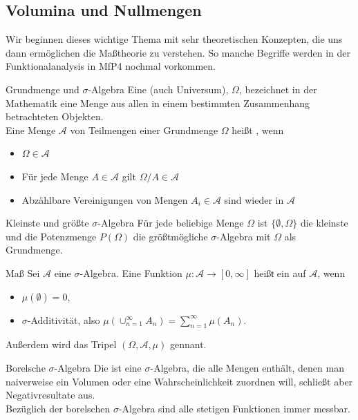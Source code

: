 \subsection{Volumina und Nullmengen}

Wir beginnen dieses wichtige Thema mit sehr theoretischen Konzepten, die uns dann ermöglichen die Maßtheorie zu verstehen. So manche Begriffe werden in der Funktionalanalysis in MfP4 nochmal vorkommen.
\begin{Def}{Grundmenge und $\sigma$-Algebra}
Eine  (auch Universum), $\Omega$, bezeichnet in der Mathematik eine Menge aus allen in einem bestimmten Zusammenhang betrachteten Objekten. \\
Eine Menge $\mathcal{A}$ von Teilmengen einer Grundmenge $\Omega$ heißt , wenn
\begin{itemize}
    \item $\Omega \in \mathcal{A}$
    \item Für jede Menge $A\in \mathcal{A}$ gilt $\Omega / A\in \mathcal{A}$
    \item Abzählbare Vereinigungen von Mengen $A_i\in \mathcal{A}$ sind wieder in $\mathcal{A}$
\end{itemize}
\end{Def}
\begin{Beispiel}{Kleinste und größte $\sigma$-Algebra}
Für jede beliebige Menge $\Omega$ ist $\{\emptyset, \Omega\}$ die kleinste und die Potenzmenge $P(\Omega)$ die größtmögliche $\sigma$-Algebra mit $\Omega$ als Grundmenge.
\end{Beispiel}
\begin{Def}{Maß}
Sei $\mathcal{A}$ eine $\sigma$-Algebra. Eine Funktion $\mu: \mathcal{A}\rightarrow[0,\infty]$ heißŧ ein  auf $\mathcal{A}$, wenn
\begin{itemize}
    \item $\mu(\emptyset)=0$,
    \item $\sigma$-Additivität, also $\mu(\cup_{n=1}^\infty A_n)=\sum_{n=1}^\infty \mu(A_n)$.
\end{itemize}
Außerdem wird das Tripel $(\Omega, \mathcal{A}, \mu)$  gennant.
\end{Def}
\begin{Beispiel}{Borelsche $\sigma$-Algebra}
Die  ist eine $\sigma$-Algebra, die alle Mengen enthält, denen man naiverweise ein Volumen oder eine Wahrscheinlichkeit zuordnen will, schließt aber Negativresultate aus. \\
Bezüglich der borelschen $\sigma$-Algebra sind alle stetigen Funktionen immer messbar.
\end{Beispiel}
